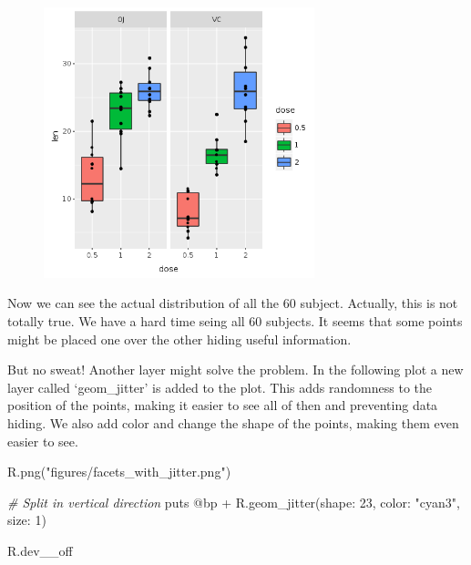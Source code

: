 \documentclass[11pt,]{article}
\newenvironment{Shaded}{\begin{snugshade}}{\end{snugshade}}
\newcommand{\DecValTok}[1]{\textcolor[rgb]{0.00,0.00,0.81}{#1}}
\newcommand{\StringTok}[1]{\textcolor[rgb]{0.31,0.60,0.02}{#1}}
\newcommand{\CommentTok}[1]{\textcolor[rgb]{0.56,0.35,0.01}{\textit{#1}}}
\newcommand{\OtherTok}[1]{\textcolor[rgb]{0.56,0.35,0.01}{#1}}
\newcommand{\NormalTok}[1]{#1}
\begin{document}
\begin{figure}
\centering
\includegraphics[width=0.70000\textwidth]{figures/facets_with_points.png}
\caption{}
\end{figure}

Now we can see the actual distribution of all the 60 subject. Actually,
this is not totally true. We have a hard time seing all 60 subjects. It
seems that some points might be placed one over the other hiding useful
information.

But no sweat! Another layer might solve the problem. In the following
plot a new layer called `geom\_jitter' is added to the plot. This adds
randomness to the position of the points, making it easier to see all of
then and preventing data hiding. We also add color and change the shape
of the points, making them even easier to see.

\begin{Shaded}
\begin{Highlighting}[]
\NormalTok{R.png(}\StringTok{"figures/facets_with_jitter.png"}\NormalTok{)}

\CommentTok{# Split in vertical direction}
\NormalTok{puts }\OtherTok{@bp}\NormalTok{ + R.geom_jitter(}\StringTok{shape: }\DecValTok{23}\NormalTok{, }\StringTok{color: "cyan3"}\NormalTok{, }\StringTok{size: }\DecValTok{1}\NormalTok{)}

\NormalTok{R.dev__off}
\end{Highlighting}
\end{Shaded}
\end{document}
